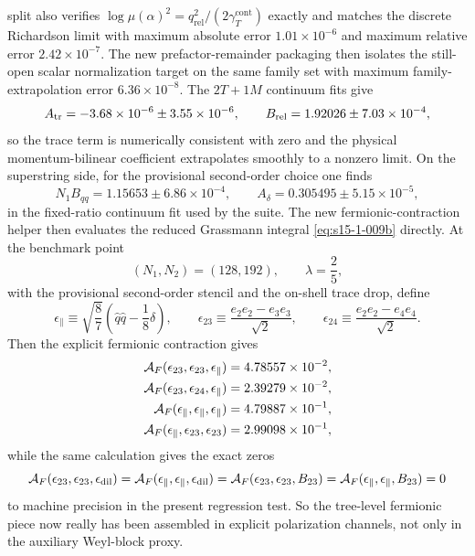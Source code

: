 \documentclass[11pt]{article}
\numberwithin{equation}{section}
\begin{document}
split also verifies $\log\mu(\alpha)^2=q_{\mathrm{rel}}^2/(2\gamma_T^{\mathrm{cont}})$ exactly and matches the discrete Richardson limit with maximum absolute error $1.01\times 10^{-6}$ and maximum relative error $2.42\times 10^{-7}$. The new prefactor-remainder packaging then isolates the still-open scalar
normalization target on the same family set with maximum family-extrapolation
error $6.36\times 10^{-8}$. The $2T+1M$ continuum fits give
\begin{equation}
\label{eq:s15-1-037}
A_{\rm tr}=-3.68\times 10^{-6}\pm 3.55\times 10^{-6},
\qquad
B_{\rm rel}=1.92026\pm 7.03\times 10^{-4},
\end{equation}
so the trace term is numerically consistent with zero and the physical momentum-bilinear coefficient extrapolates smoothly to a nonzero limit. On the superstring side, for the provisional second-order choice one finds
\begin{equation}
\label{eq:s15-1-038}
N_1 B_{qq}=1.15653\pm 6.86\times 10^{-4},
\qquad
A_\delta=0.305495\pm 5.15\times 10^{-5},
\end{equation}
in the fixed-ratio continuum fit used by the suite.
The new fermionic-contraction helper then evaluates the reduced Grassmann integral \eqref{eq:s15-1-009b} directly. At the benchmark point
\begin{equation}
\label{eq:s15-1-038a}
(N_1,N_2)=(128,192),
\qquad
\lambda=\frac25,
\end{equation}
with the provisional second-order stencil and the on-shell trace drop, define
\begin{equation}
\label{eq:s15-1-038b}
\epsilon_\parallel
\equiv
\sqrt{\frac87}\left(\hat q\hat q-\frac18\delta\right),
\qquad
\epsilon_{23}
\equiv
\frac{e_2e_2-e_3e_3}{\sqrt2},
\qquad
\epsilon_{24}
\equiv
\frac{e_2e_2-e_4e_4}{\sqrt2}.
\end{equation}
Then the explicit fermionic contraction gives
\begin{equation}
\label{eq:s15-1-038c}
\begin{aligned}
{\cal A}_F(\epsilon_{23},\epsilon_{23},\epsilon_\parallel)
&=4.78557\times 10^{-2},\\
{\cal A}_F(\epsilon_{23},\epsilon_{24},\epsilon_\parallel)
&=2.39279\times 10^{-2},\\
{\cal A}_F(\epsilon_\parallel,\epsilon_\parallel,\epsilon_\parallel)
&=4.79887\times 10^{-1},\\
{\cal A}_F(\epsilon_\parallel,\epsilon_{23},\epsilon_{23})
&=2.99098\times 10^{-1},
\end{aligned}
\end{equation}
while the same calculation gives the exact zeros
\begin{equation}
\label{eq:s15-1-038d}
{\cal A}_F(\epsilon_{23},\epsilon_{23},\epsilon_{\rm dil})
=
{\cal A}_F(\epsilon_\parallel,\epsilon_\parallel,\epsilon_{\rm dil})
=
{\cal A}_F(\epsilon_{23},\epsilon_{23},B_{23})
=
{\cal A}_F(\epsilon_\parallel,\epsilon_\parallel,B_{23})
=0
\end{equation}
to machine precision in the present regression test. So the tree-level fermionic piece now really has been assembled in explicit polarization channels, not only in the auxiliary Weyl-block proxy.
\end{document}
